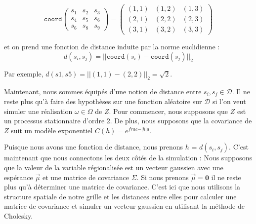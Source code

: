 \documentclass[10pt]{article} %
\begin{document}
$$
    \texttt{coord}
    \begin{pmatrix}
        s_1 & s_2 & s_3 \\
        s_4 & s_5 & s_6 \\
        s_6 & s_8 & s_9
    \end{pmatrix}
    =
    \begin{pmatrix}
        (1, 1) & (1, 2) & (1, 3) \\
        (2, 1) & (2, 2) &(2, 3) \\
        (3, 1) & (3, 2) & (3, 3)
    \end{pmatrix}
$$

et on prend une fonction de distance induite par la norme euclidienne :
$$ d(s_i, s_j) = || \texttt{coord}(s_i) - \texttt{coord}(s_j)||_2 $$

Par exemple, $d(s1, s5) = ||(1, 1) - (2, 2)||_2 = \sqrt{2}$.


Maintenant, nous sommes équipés d'une notion de distance entre $s_i, s_j \in \mathcal{D}$. Il ne reste plus qu'à faire des hypothèses sur une fonction aléatoire
sur $\mathcal{D}$ si l'on veut simuler une réalisation $\omega \in \Omega$ de $Z$. Pour commencer, nous supposons que $Z$ est un processus stationnaire d'ordre 2.
De plus, nous supposons que la covariance de $Z$ suit un modèle exponentiel $C(h) = e^{frac{-|h|}{a}}$.



Puisque nous avons une fonction de distance, nous prenons $h$ = $d(s_i, s_j)$. C'est maintenant que nous connectons les deux côtés de la simulation :
Nous supposons que la valeur de la variable régionalisée est un vecteur gaussien avec une espérance $\vec\mu$ et une matrice de covariance $\Sigma$.
Si nous prenons $\vec\mu = \textbf{0}$ il ne reste plus qu'à déterminer une matrice de covariance. C'est ici que nous utilisons la structure spatiale
de notre grille et les distances entre elles pour calculer une matrice de covariance et simuler un vecteur gaussien en utilisant la méthode de Cholesky.
\end{document}
